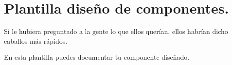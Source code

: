 \documentclass[11pt,fleqn]{book} %
\begin{document}
\chapter{\large{Plantilla diseño de componentes.}}
\begin{center}
	\begin{tcolorbox}[enhanced,title=\scriptsize\textbf{HENRY FORD},attach boxed title to top center={yshift=-\tcboxedtitleheight/2},boxed title style={size=small,arc=0mm,colback=white,colframe=color1,frame hidden},colback=white,colframe=color2,arc=0mm,leftrule=0mm,rightrule=0mm,coltitle=orange,width=8cm]
	\begin{center}
		\textcolor{colorFF1}{Si le hubiera preguntado a la gente lo que ellos querían, ellos habrían dicho caballos más rápidos.}
	\end{center}
	\end{tcolorbox}
\end{center}

En esta plantilla puedes documentar tu componente diseñado. 

	
	\newpage
	



\end{document}
